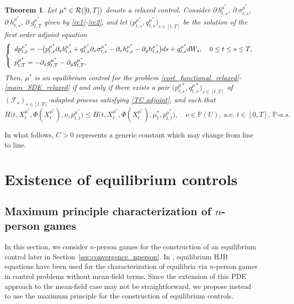 \documentclass[12pt]{article}
\newtheorem{theorem}[prop]{Theorem}
\theoremstyle{named}
\numberwithin{equation}{section}
\def\P{{\mathord{\mathbb P}}}
\let\oldcitet=\citet
\renewcommand{\cite}[1]{\textcolor[rgb]{0,0,1}{\oldcitet{#1}}}
\renewcommand{\citet}[1]{\textcolor[rgb]{0,0,1}{\oldcitet{#1}}}
\begin{document}
   \begin{theorem}
   \label{MP TC}
  Let $\mu^* \in {\cal R}([0,T])$ denote a
  relaxed control.
  Consider $\partial_{\boldsymbol{\cdot}} b^{\mu^*}_{t,s}$,
  $\partial_{\boldsymbol{\cdot}} \sigma^{\mu^*}_{t,s}$,
  $\partial_{\boldsymbol{\cdot}} h^{\mu^*}_{t,s}$,
 $\partial_{\boldsymbol{\cdot}} g^{\mu^*}_{t,T}$
 given by
 \eqref{rc1}-\eqref{rc2},
 and let
     $\big(p^{\mu^* }_{t,s}, q^{\mu^* }_{t,s}\big)_{s\in [t,T]}$
 be the solution of the first order adjoint equation
\begin{equation}\label{TC adjoint}
  \left\{
  \begin{array}{l}
    \displaystyle
    dp^{\mu^*}_{t,s} = -\big(p^{\mu^*}_{t,s}\partial_xb^{\mu^*}_{t,s}  + q^{\mu^*}_{t,s}\partial_x\sigma^{\mu^*}_{t,s} - \partial_xh^{\mu^*}_{t,s} - \partial_yh^{\mu^*}_{t,s}\big) ds + q^{\mu^*}_{t,s} dW_s, \quad 0 \leq t \leq s \leq T,
\medskip
\\
\displaystyle
    p^{\mu^*}_{t,T} = - \partial_xg^{\mu^*}_{t,T} - \partial_yg^{\mu^*}_{t,T}.
  \end{array}
  \right.
\end{equation}
Then, $\mu^*$ is an equilibrium control
 for the problem \eqref{cost_functional_relaxed}-\eqref{main_SDE_relaxed}
 if and only if there exists a pair
 $\big(p_{t,s}^{\mu *},q_{t,s}^{\mu *}\big)_{s\in [t,T]}$
 of $(\mathcal{F}_s)_{s\in [t,T]}$-adapted process
 satisfying \eqref{TC adjoint}, and such that
\begin{equation}
\nonumber
H\bigl(t,X^{\mu^*}_t,\Phi(X^{\mu^*}_t),\nu,p^{\mu^*}_{t,t}\bigr) \leq H\bigl(t,X^{\mu^*}_t,\Phi(X^{\mu^*}_t),\mu^*_t,p^{\mu^*}_{t,t}\bigr), \quad
 \nu \in \P (U), \ \text{a.e. } t \in [0,T], \ \P\mbox{-}a.s.
\end{equation}
 \end{theorem}
 \noindent
 In what follows,
 $C>0$ represents a generic constant which may change from line to line.
\section{Existence of equilibrium controls}
\subsection{Maximum principle characterization of $n$-person games}
\label{sec:characterization_nperson}
In this section, we consider $n$-person games for the construction of
an equilibrium control later in Section~\ref{sec:convergence_nperson}.
In \cite{yong2012time}, equilibrium HJB equations have been used for the
characterization of equilibria via $n$-person games in control
problems without mean-field terms.
Since the extension of this PDE approach to
the mean-field case may not be straightforward,
we propose instead
to use the maximum principle
for the construction of equilibrium controls.
\end{document}
